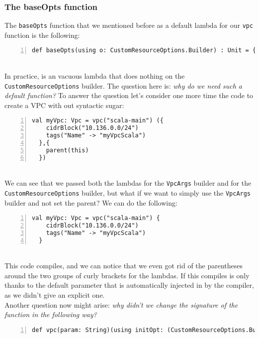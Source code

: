 \subsubsection{The baseOpts function}
The \texttt{baseOpts} function that we mentioned before as a default lambda for our \texttt{vpc} function is the following:
\begin{lstlisting}[numbers=left, numberstyle=\tiny, numbersep=-5pt, stepnumber=1]
  def baseOpts(using o: CustomResourceOptions.Builder) : Unit = {}
\end{lstlisting}\mbox{}\\
In practice, is an vacuous lambda that does nothing on the \texttt{CustomResourceOptions} builder.
The question here is: \textit{why do we need such a default function?}
To answer the question let's consider one more time the code to create a VPC with out syntactic sugar:
\begin{lstlisting}[numbers=left, numberstyle=\tiny, numbersep=-5pt, stepnumber=1]
  val myVpc: Vpc = vpc("scala-main") ({
    cidrBlock("10.136.0.0/24")
    tags("Name" -> "myVpcScala")
  },{
    parent(this)
  })
\end{lstlisting}\mbox{}\\
We can see that we passed both the lambdas for the \texttt{VpcArgs} builder and for the \texttt{CustomResourceOptions} builder, but what if we want to simply use the \texttt{VpcArgs} builder and not set the parent?
We can do the following:
\begin{lstlisting}[numbers=left, numberstyle=\tiny, numbersep=-5pt, stepnumber=1]
  val myVpc: Vpc = vpc("scala-main") {
    cidrBlock("10.136.0.0/24")
    tags("Name" -> "myVpcScala")
  }
\end{lstlisting}\mbox{}\\
This code compiles, and we can notice that we even got rid of the parentheses around the two groups of curly brackets for the lambdas.
If this compiles is only thanks to the default parameter that is automatically injected in by the compiler, as we didn't give an explicit one.\\
Another question now might arise: \textit{why didn't we change the signature of the function in the following way?}
\begin{lstlisting}[numbers=left, numberstyle=\tiny, numbersep=-5pt, stepnumber=1]
  def vpc(param: String)(using initOpt: (CustomResourceOptions.Builder ?=> Unit), init: VpcArgs.Builder ?=> Unit) : ecc.
\end{lstlisting}\mbox{}\\
